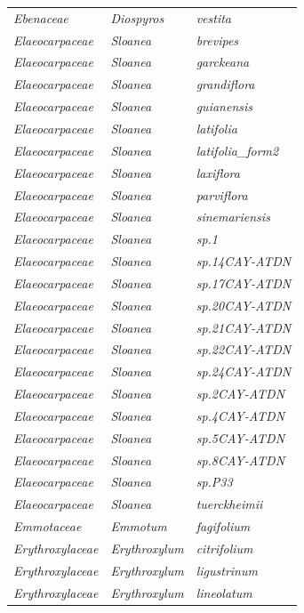 \documentclass[fleqn,10pt]{ArtEcoFoG} %
\begin{document}
\begin{table}[t]
\begin{tabular}{lll}
\em{Ebenaceae} & \em{Diospyros} & \em{vestita}\\
\em{Elaeocarpaceae} & \em{Sloanea} & \em{brevipes}\\
\em{Elaeocarpaceae} & \em{Sloanea} & \em{garckeana}\\
\addlinespace
\em{Elaeocarpaceae} & \em{Sloanea} & \em{grandiflora}\\
\em{Elaeocarpaceae} & \em{Sloanea} & \em{guianensis}\\
\em{Elaeocarpaceae} & \em{Sloanea} & \em{latifolia}\\
\em{Elaeocarpaceae} & \em{Sloanea} & \em{latifolia\_form2}\\
\em{Elaeocarpaceae} & \em{Sloanea} & \em{laxiflora}\\
\addlinespace
\em{Elaeocarpaceae} & \em{Sloanea} & \em{parviflora}\\
\em{Elaeocarpaceae} & \em{Sloanea} & \em{sinemariensis}\\
\em{Elaeocarpaceae} & \em{Sloanea} & \em{sp.1}\\
\em{Elaeocarpaceae} & \em{Sloanea} & \em{sp.14CAY-ATDN}\\
\em{Elaeocarpaceae} & \em{Sloanea} & \em{sp.17CAY-ATDN}\\
\addlinespace
\em{Elaeocarpaceae} & \em{Sloanea} & \em{sp.20CAY-ATDN}\\
\em{Elaeocarpaceae} & \em{Sloanea} & \em{sp.21CAY-ATDN}\\
\em{Elaeocarpaceae} & \em{Sloanea} & \em{sp.22CAY-ATDN}\\
\em{Elaeocarpaceae} & \em{Sloanea} & \em{sp.24CAY-ATDN}\\
\em{Elaeocarpaceae} & \em{Sloanea} & \em{sp.2CAY-ATDN}\\
\addlinespace
\em{Elaeocarpaceae} & \em{Sloanea} & \em{sp.4CAY-ATDN}\\
\em{Elaeocarpaceae} & \em{Sloanea} & \em{sp.5CAY-ATDN}\\
\em{Elaeocarpaceae} & \em{Sloanea} & \em{sp.8CAY-ATDN}\\
\em{Elaeocarpaceae} & \em{Sloanea} & \em{sp.P33}\\
\em{Elaeocarpaceae} & \em{Sloanea} & \em{tuerckheimii}\\
\addlinespace
\em{Emmotaceae} & \em{Emmotum} & \em{fagifolium}\\
\em{Erythroxylaceae} & \em{Erythroxylum} & \em{citrifolium}\\
\em{Erythroxylaceae} & \em{Erythroxylum} & \em{ligustrinum}\\
\em{Erythroxylaceae} & \em{Erythroxylum} & \em{lineolatum}\\

\end{tabular}
\end{table}
\end{document}
